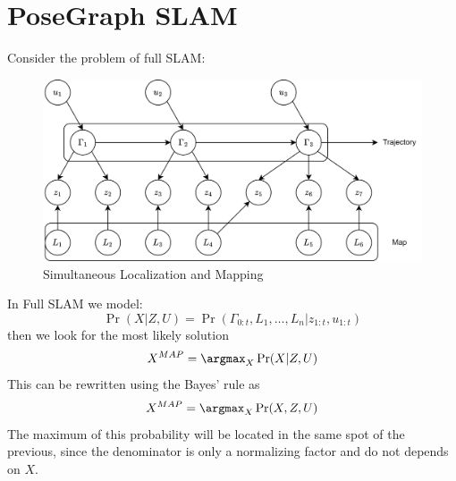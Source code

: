 \section{PoseGraph SLAM}

Consider the problem of full SLAM: 
\begin{figure}[H]
    \centering
    \includegraphics[width=0.75\linewidth]{images/slam.png}
    \caption{Simultaneous Localization and Mapping}
\end{figure}
In Full SLAM we model: 
\[\Pr(X|Z,U)=\Pr(\Gamma_{0:t},L_1,\ldots,L_n|z_{1:t},u_{1:t})\]
then we look for the most likely solution
\[X^{MAP}=\argmax_X\Pr(X|Z,U)\]
This can be rewritten using the Bayes' rule as
\[X^{MAP}=\argmax_X\Pr(X,Z,U)\]
The maximum of this probability will be located in the same spot of the previous, since the denominator is only a normalizing factor and do not depends on $X$. 

